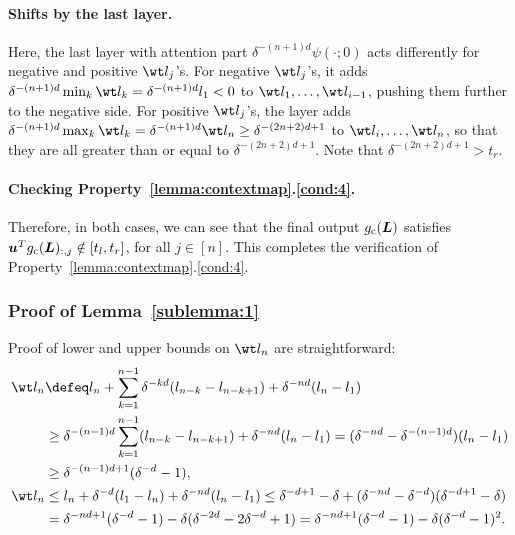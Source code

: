 \documentclass{article} %
\def\vu{{\bm{u}}}
\def\mL{{\bm{L}}}
\begin{document}
\paragraph{Shifts by the last layer.}
Here, the last layer with attention part $\delta^{-(n+1)d} \psi(\cdot;0)$ acts differently for negative and positive $\wt l_j$'s. 
For negative $\wt l_j$'s, it adds $\delta^{-(n+1)d} \min_k \wt l_{k} = \delta^{-(n+1)d} l_1 < 0$ to $\wt l_1, \dots, \wt l_{i-1}$, pushing them further to the negative side.
For positive $\wt l_j$'s, the layer adds $\delta^{-(n+1)d} \max_k \wt l_{k} = \delta^{-(n+1)d} \wt l_n \geq \delta^{-(2n+2)d+1}$ to $\wt l_{i}, \dots, \wt l_{n}$, so that they are all greater than or equal to $\delta^{-(2n+2)d+1}$. Note that $\delta^{-(2n+2)d+1} > t_r$.

\paragraph{Checking Property~\ref{lemma:contextmap}.\ref{cond:4}.}
Therefore, in both cases, we can see that the final output $g_{\rm c}(\mL)$ satisfies $\vu^T g_{\rm c}(\mL)_{:,j} \notin [t_l, t_r]$, for all $j \in [n]$.
This completes the verification of Property~\ref{lemma:contextmap}.\ref{cond:4}.

\subsubsection{Proof of Lemma~\ref{sublemma:1}}
\label{sec:proof-sublemma:1}
Proof of lower and upper bounds on $\wt l_n$ are straightforward:
\begin{align*}
    \wt l_n
    &\defeq l_n + \sum_{k=1}^{n-1} \delta^{-kd}(l_{n-k}-l_{n-k+1}) + \delta^{-nd} (l_n-l_1)\\
    &\geq \delta^{-(n-1)d}\sum_{k=1}^{n-1} (l_{n-k}-l_{n-k+1}) + \delta^{-nd} (l_n-l_1)
    = (\delta^{-nd}-\delta^{-(n-1)d}) (l_n-l_1)\\
    &\geq \delta^{-(n-1)d+1}(\delta^{-d} - 1),\\
    \wt l_n
    &\leq l_n + \delta^{-d} (l_1 - l_n) + \delta^{-nd}(l_n - l_1)
    \leq \delta^{-d+1} - \delta + (\delta^{-nd} - \delta^{-d}) (\delta^{-d+1} - \delta)\\
    &=\delta^{-nd + 1}(\delta^{-d}-1) - \delta (\delta^{-2d} - 2\delta^{-d} + 1)
    = \delta^{-nd + 1}(\delta^{-d}-1) - \delta (\delta^{-d} - 1)^2.
\end{align*}
\end{document}
